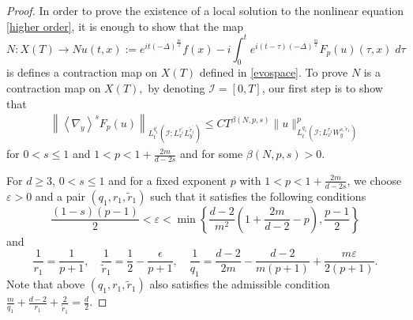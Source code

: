 \documentclass[a4paper,11pt, reqno]{amsart}
\theoremstyle{definition}
\theoremstyle{remark}
\numberwithin{equation}{section}
\begin{document}
	\begin{proof}
		
		 
		In order to prove the existence of a local solution to the nonlinear equation \eqref{higher order}, it is enough to show that the map $$N: X(T)\to Nu(t, x):=e^{i t (-\Delta)^{\frac{m}{2}}} f(x)-i \int_0^t e^{i(t-\tau) (-\Delta)^{\frac{m}{2}}} F_p(u)(\tau, x)\; d \tau$$
		is defines a contraction map on $X(T)$ defined in \eqref{evospace}. To prove $N$ is a contraction map on $X(T),$ by denoting $\mathcal{I}= [0,T]$,  our first step is to show  that
		\begin{align*}
			\left\|\left\langle\nabla_y\right\rangle^s F_p(u)\right\|_{L_t^{q_1^{\prime}}\left(\mathcal{I} ; L_x^{r_1^{\prime}} L_y^{\tilde{r}_1^{\prime}}\right)} \leq C T^{\beta(N, p, s)}\|u\|_{L_t^{q_1}\left(\mathcal{I} ; L_x^{r_1} W_y^{s, \tilde{r}_1}\right)}^p
		\end{align*}
		for $0<s \leq 1$ and $1<p<1+\frac{2m}{d-2s}$ and for  some  $\beta(N, p, s)>0$. 
		
		
		
		For $d \geq 3$, $0<s \leq 1$ and for a fixed exponent $p$ with  $1<p<1+\frac{2m}{d-2s}$, we   choose   $\varepsilon>0$ and  a pair $\left(q_1, r_1, \widetilde{r}_1\right)$ such that it satisfies the following conditions  
		$$
		\frac{(1-s)(p-1)}{2}<\varepsilon<\min \left\{\frac{d-2}{m^2}\left(1+\frac{2m}{d-2}-p\right), \frac{p-1}{2}\right\}
		$$
		and 
		\begin{equation} \label{mxm}
		    \frac{1}{r_1}=\frac{1}{p+1}, \quad \frac{1}{\widetilde{r}_1}=\frac{1}{2}-\frac{\epsilon}{p+1}, \quad \frac{1}{q_1}=\frac{d-2}{2m}-\frac{d-2}{m(p+1)}+\frac{m\varepsilon}{2(p+1)}.
		\end{equation}
		Note that above   $\left(q_1, r_1, \widetilde{r}_1\right)$ also satisfies the admissible condition 	$\frac{{{m}}}{q_1}+\frac{d-2}{r_1}+\frac{2}{\widetilde{r}_1}=\frac{d}{2}.$
        

\end{proof}
\end{document}
